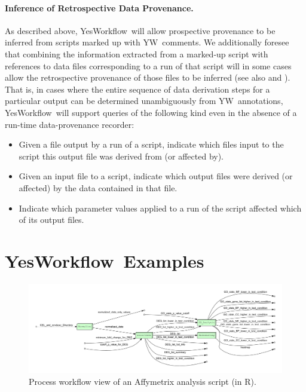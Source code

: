 \documentclass[15]{idcc}
\newcommand{\YW}{\textsf{YesWorkflow}}
\newcommand{\yw}{\textsf{YW}}
\newcommand{\YWT}{YesWorkflow}
\newcommand{\R}{R}
\begin{document}
\paragraph{Inference of Retrospective Data Provenance.}
As described above, \YW\ will allow prospective provenance to be
inferred from scripts marked up with \yw\ comments.  We additionally
foresee that combining the information extracted from a marked-up
script with references to data files corresponding to a run of that
script will in some cases allow the retrospective provenance of those files to be
inferred (see also  and
). That is, in cases where the entire sequence of data
derivation steps for a particular output can be determined unambiguously from \yw\
annotations, \YW\ will support queries of the following kind even in the absence of a
run-time data-provenance recorder:
\begin{itemize} 
\item Given a file output by a run of a script, indicate which files
  input to the script this output file was derived  from (or affected
  by). 
\item Given an input file to a script, indicate which  output files
  were derived (or affected) by the data contained in that file.
\item Indicate which parameter values applied to a run of the
  script affected which of its output files. 
\end{itemize}



\section{\YWT\ Examples}

 \begin{figure}[t]
   \centering
   \includegraphics[width=.99\textwidth]{figures/Affymetrix_process_whitebox-crop.pdf}
   \caption{Process workflow view of an
     Affymetrix analysis script (in \R).}
   \label{fig-affymetrics}
 \end{figure}
\end{document}
